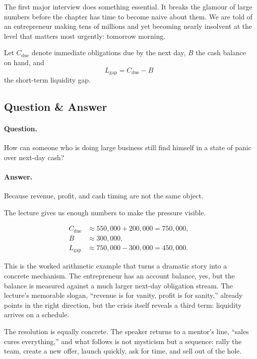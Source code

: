 The first major interview does something essential. It breaks the glamour of large numbers before the chapter has time to become naive about them. We are told of an entrepreneur making tens of millions and yet becoming nearly insolvent at the level that matters most urgently: tomorrow morning.

\begin{definition}
Let \(C_{\text{due}}\) denote immediate obligations due by the next day, \(B\) the cash balance on hand, and
\[
L_{\text{gap}} = C_{\text{due}} - B
\]
the short-term liquidity gap.
\end{definition}

\subsection{Question \& Answer}

\paragraph{Question.} How can someone who is doing large business still find himself in a state of panic over next-day cash?

\paragraph{Answer.} Because revenue, profit, and cash timing are not the same object.

The lecture gives us enough numbers to make the pressure visible.

\begin{align}
C_{\text{due}} &\approx 550{,}000 + 200{,}000 = 750{,}000,\\
B &\approx 300{,}000,\\
L_{\text{gap}} &\approx 750{,}000 - 300{,}000 = 450{,}000.
\end{align}

This is the worked arithmetic example that turns a dramatic story into a concrete mechanism. The entrepreneur has an account balance, yes, but the balance is measured against a much larger next-day obligation stream. The lecture's memorable slogan, ``revenue is for vanity, profit is for sanity,'' already points in the right direction, but the crisis itself reveals a third term: liquidity arrives on a schedule.

The resolution is equally concrete. The speaker returns to a mentor's line, ``sales cures everything,'' and what follows is not mysticism but a sequence: rally the team, create a new offer, launch quickly, ask for time, and sell out of the hole.

